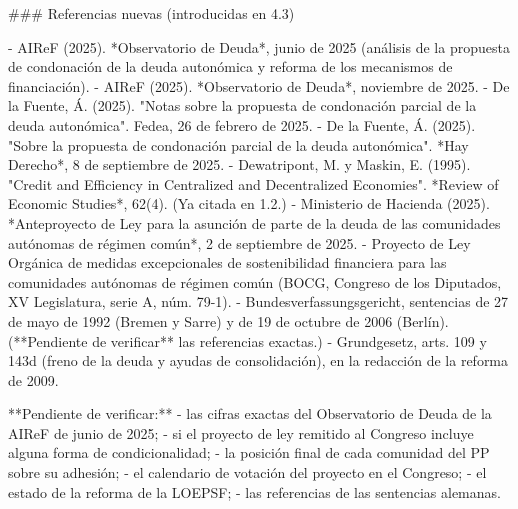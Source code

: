 \documentclass[10pt,a4paper]{article}
\begin{document}
{### Referencias nuevas (introducidas en 4.3)

- AIReF (2025). *Observatorio de Deuda*, junio de 2025 (análisis de la propuesta de condonación de la deuda autonómica y reforma de los mecanismos de financiación).
- AIReF (2025). *Observatorio de Deuda*, noviembre de 2025.
- De la Fuente, Á. (2025). "Notas sobre la propuesta de condonación parcial de la deuda autonómica". Fedea, 26 de febrero de 2025.
- De la Fuente, Á. (2025). "Sobre la propuesta de condonación parcial de la deuda autonómica". *Hay Derecho*, 8 de septiembre de 2025.
- Dewatripont, M. y Maskin, E. (1995). "Credit and Efficiency in Centralized and Decentralized Economies". *Review of Economic Studies*, 62(4). (Ya citada en 1.2.)
- Ministerio de Hacienda (2025). *Anteproyecto de Ley para la asunción de parte de la deuda de las comunidades autónomas de régimen común*, 2 de septiembre de 2025.
- Proyecto de Ley Orgánica de medidas excepcionales de sostenibilidad financiera para las comunidades autónomas de régimen común (BOCG, Congreso de los Diputados, XV Legislatura, serie A, núm. 79-1).
- Bundesverfassungsgericht, sentencias de 27 de mayo de 1992 (Bremen y Sarre) y de 19 de octubre de 2006 (Berlín). (**Pendiente de verificar** las referencias exactas.)
- Grundgesetz, arts. 109 y 143d (freno de la deuda y ayudas de consolidación), en la redacción de la reforma de 2009.

**Pendiente de verificar:**
- las cifras exactas del Observatorio de Deuda de la AIReF de junio de 2025;
- si el proyecto de ley remitido al Congreso incluye alguna forma de condicionalidad;
- la posición final de cada comunidad del PP sobre su adhesión;
- el calendario de votación del proyecto en el Congreso;
- el estado de la reforma de la LOEPSF;
- las referencias de las sentencias alemanas.

}
\end{document}
